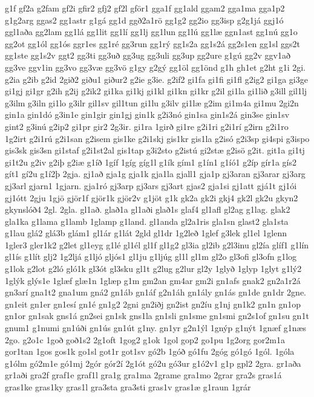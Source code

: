 {g1f
gf2a
g2fam
gf2i
gfir2
gfj2
gf2l
gför1
gga1f
gg1ald
ggam2
gga1ma
gga1p2
g1g2arg
ggas2
gg1astr
g1gá
gg1d
ggð2a1rö
gg1g2
gg2io
gg3isp
g2g1já
ggj1ó
ggl1aða
gg2lam
gg1lá
gg1lit
gg1lí
gg1lj
gg1lun
gg1lú
gg1læ
ggn1ast
gg1nú
gg1o
gg2ot
gg1ól
gg1ós
ggr1es
gg1ré
gg3run
gg1rý
gg1s2a
gg1s2á
gg2s1en
gg1sl
ggs2t
gg1ste
gg1s2v
ggt2
gg3ti
gg3uð
gg3ug
gg3uli
gg3up
gg2ure
g1gú
gg2v
ggv1að
gg3ve
ggv1in
gg3vo
gg3væ
gg3vö
g1gy
g2gý
gg1öl
gg1önd
g1h
gh1et
g2ht
g1i
2gi.
g2ia
g2ib
g2id
2gið2
giðu1
giður2
g2ie
g3ie.
g2if2
gi1fa
gi1fi
gi1fl
g2ig2
gi1ga
gi3ge
gi1gj
gi1gr
g2ih
g2ij
g2ik2
gi1ka
gi1kj
gi1kl
gi1kn
gi1kr
g2il
gi1la
gi1lið
g3ill
gil1lj
g3ilm
g3iln
gi1lo
g3ilr
gil1sv
gil1tun
gi1lu
g3ilv
gi1læ
g2im
gi1m4a
gi1mu
2gi2n
gin1a
gin1dó
g3in1e
gin1gir
gin1gj
gin1k
g2i3nó
gin1sa
gin1s2á
gin3se
gin1sv
gint2
g3inú
g2ip2
gi1pr
gir2
2g3ir.
gi1ra
1girð
gi1re
g2i1ri
g2i1rí
g2irn
g2i1ro
1g2irt
g2i1rú
g2i1san
g2isem
gis1ke
g2i1skj
gis1kr
gis1la
g2isó
g2i3sp
gi4spi
g3ispo
gis3sk
gis3sn
gi1staf
g2i1st2al
gis1tap
g3i2sto
g2istú
gi2stæ
g2isö
g2it.
git1a
gi1tj
gi1t2u
g2iv
g2iþ
g2iæ
g1íð
1gíf
1gíg
gíg1l
g1ík
gím1
g1ín1
g1íó1
g2íp
gír1a
gís2
gít1
gí2u
g1í2þ
2gja.
gj1að
gja1g
gja1k
gja1la
gjall1
gja1p
gj3aran
gj3arar
gj3arg
gj3arl
gjarn1
1gjarn.
gja1ró
gj3arp
gj3ars
gj3art
gjas2
gja1si
gj1att
gjá1t
gj1ói
gj1ótt
2gju
1gjö
gjör1f
gjör1k
gjör2v
g1jöt
g1k
gk2a
gk2i
gkj4
gk2l
gk2u
gkyn2
gkynslóð4
2gl.
2gla.
gl1að.
glað1a
gl1aði
glað1s
glaf4
gl1afl
gl2ag
g1lag.
glak2
gla1ka
g1lama
g1lamb
1glamp
g1land.
gl1anda
gl2a1ris
gla1sn
glast2
gla1sta
g1lau
glá2
glá3b
glám1
gl1ár
g1lát
2gld
gl1dr
1g2leð
1glef
g3lek
gl1el
1glenn
1gler3
gler1k2
g2let
gl1eyg
g1lé
gl1él
gl1f
gl1g2
gl3ia
gl2ib
g2l3inu
gl2ía
glíf1
g1lín
gl1ís
g1lít
glj2
1g2ljá
g1ljó
gljós1
gl1ju
g1ljúg
gl1l
gl1m
gl2o
gl3ofi
gl3ofn
g1log
g1lok
g2lot
g2ló
gló1k
gl3ót
gl3sku
gl1t
g2lug
g2lur
gl2y
1glyð
1glyp
1glyt
g1lý2
1glýk
glýs1e
1glæf
glæ1n
1glæp
g1m
gm2an
gm4ar
gm2i
gn1afs
gnak2
gn2a1r2á
gn3arí
gna1t2
gna1um
gná2
gn1áb
gn1áf
g2n1áh
gn1ály
gn1ás
gn1de
gn1dr
2gne.
gn1eit
gn1er
gn1esí
gn1é
gn1g2
2gni
gn2iðj
gn2ist
gn2íu
g1nj
gn1k2
gn1n
gn1op
gn1or
gn1sak
gns1á
gn2sei
gn1sk
gns1la
gn1sli
gn1sme
gn1smi
gn2s1of
gn1su
gn1t
gnum1
g1numi
gn1úði
gn1ús
gn1út
g1ny.
gn1yr
g2n1ýl
1gnýp
g1nýt
1gnæf
g1næs
2go.
g2o1c
1goð
goð1s2
2g1oft
1gog2
g1ok
1gol
gop2
go1pu
1g2org
gor2m1a
gor1tan
1gos
gos1k
go1sl
got1r
got1sv
gó2b
1góð
gó1fu
2góg
gó1gó
1gól.
1góla
g1ólm
gó2m1e
gó1mj
2gór
gór2í
2g1ót
gó2u
gó3ur
g1ó2v1
g1p
gpl2
2gra.
gr1aða
gr1aði
gra2f
graf1e
graf1l
gra1g
gra1ma
2grame
gra1mo
2grar
gra2s
gras1á
gras1ke
gras1ky
gras1l
gra3sta
gra3sti
gras1v
gras1æ
g1raun
1grár
}
